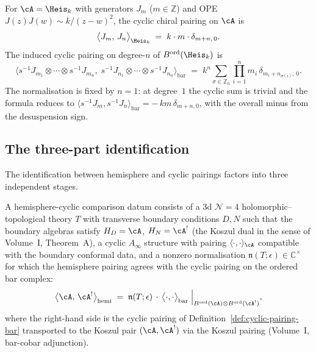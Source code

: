 \begin{computation}
\label{comp:heisenberg-cyclic-pairing}
For $\cA = \Heis_k$ with generators $J_m$ ($m\in\mathbb Z$) and
OPE $J(z)J(w)\sim k/(z-w)^2$, the cyclic chiral pairing on
$\cA$ is
\[
 \bigl\langle J_m,\, J_n\bigr\rangle_{\Heis_k}
 \;=\;
 k\cdot m\cdot \delta_{m+n,\,0}.
\]
The induced cyclic pairing on degree-$n$ of
$B^{\mathrm{ord}}(\Heis_k)$ is
\[
 \bigl\langle
 s^{-1}J_{m_1}\otimes\cdots\otimes s^{-1}J_{m_n},\;
 s^{-1}J_{n_1}\otimes\cdots\otimes s^{-1}J_{n_n}
 \bigr\rangle_{\mathrm{bar}}
 \;=\;
 k^n\sum_{\sigma\in\mathbb Z_n}
 \prod_{i=1}^n m_i\,
 \delta_{m_i + n_{\sigma(i)},\,0}.
\]
The normalisation is fixed by $n=1$: at degree~$1$ the cyclic sum
is trivial and the formula reduces to
$\langle s^{-1}J_m, s^{-1}J_n\rangle_{\mathrm{bar}} = -\,km\,
\delta_{m+n,0}$, with the overall minus from the desuspension
sign.
\end{computation}

\subsection{The three-part identification}
\label{subsec:three-part-identification}

The identification between hemisphere and cyclic pairings factors into
three independent stages.

\begin{definition}
\label{def:hemisphere-cyclic-pairing}
A hemisphere-cyclic comparison datum consists of a $3$d
$\mathcal N=4$ holomorphic--topological theory \(T\)
with transverse boundary conditions $D,N$ such that the boundary
algebras satisfy $H_D = \cA$, $H_N = \cA^!$ (the Koszul dual in
the sense of Volume~I, Theorem~A), a
cyclic $A_\infty$ structure with pairing
$\langle\cdot,\cdot\rangle_\cA$ compatible with the boundary
conformal data, and a
nonzero normalisation $\mathfrak n(T;\epsilon)\in\mathbb C^\times$
for which the hemisphere pairing agrees with the cyclic pairing on
the ordered bar complex:
\[
 \bigl\langle \cA,\, \cA^!\bigr\rangle_{\mathrm{hemi}}
 \;=\;
 \mathfrak n(T;\epsilon)\,\cdot\,
 \bigl\langle\cdot,\cdot\bigr\rangle_{\mathrm{bar}}
 \;\Big|_{B^{\mathrm{ord}}(\cA)\otimes
 B^{\mathrm{ord}}(\cA^!)},
\]
where the right-hand side is the cyclic pairing of
Definition~\ref{def:cyclic-pairing-bar} transported to the
Koszul pair $(\cA, \cA^!)$ via the Koszul pairing
(Volume~I, bar-cobar adjunction).
\end{definition}

